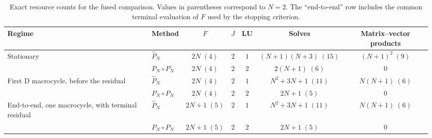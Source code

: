 \begin{table}[htbp]
\centering
\scriptsize
\caption{Exact resource counts for the fused comparison. Values
in parentheses correspond to $N=2$. The ``end-to-end'' row
includes the common terminal evaluation of $F$ used by the stopping criterion.}
\label{tab:fusion-resource-accounting}
\begin{tabularx}{\textwidth}{Xlccccc}
\toprule
Regime & Method & $F$ & $J$ & LU & Solves & Matrix--vector products\\
\midrule
Stationary
& $\widehat P_N$
& $2N\;(4)$ & $2$ & $1$ & $(N+1)(N+3)\;(15)$ & $(N+1)^2\;(9)$\\
& $P_N\circ P_N$
& $2N\;(4)$ & $2$ & $2$ & $2(N+1)\;(6)$ & $0$\\
\addlinespace
First D macrocycle, before the residual
& $\widehat P_N$
& $2N\;(4)$ & $2$ & $1$ & $N^2+3N+1\;(11)$ & $N(N+1)\;(6)$\\
& $P_N\circ P_N$
& $2N\;(4)$ & $2$ & $2$ & $2N+1\;(5)$ & $0$\\
\addlinespace
End-to-end, one macrocycle, with terminal residual
& $\widehat P_N$
& $2N+1\;(5)$ & $2$ & $1$ & $N^2+3N+1\;(11)$ & $N(N+1)\;(6)$\\
& $P_N\circ P_N$
& $2N+1\;(5)$ & $2$ & $2$ & $2N+1\;(5)$ & $0$\\
\bottomrule
\end{tabularx}
\end{table}
